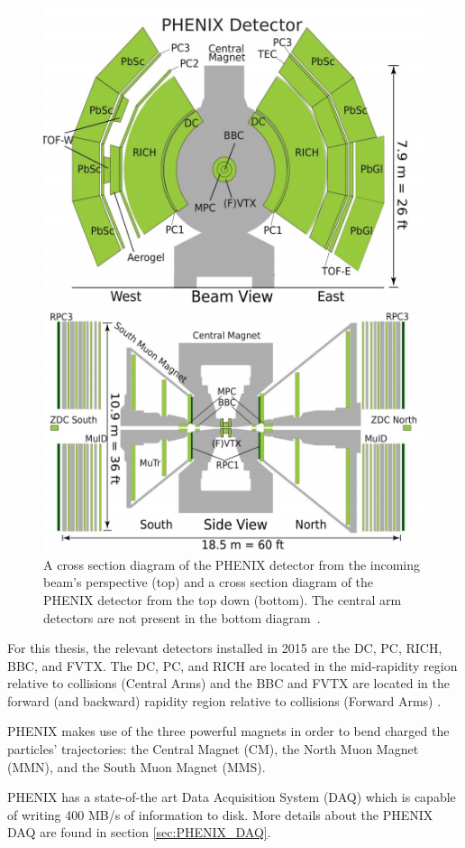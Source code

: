\begin{figure}[!h]
\begin{center}
\includegraphics[width=0.55\linewidth]{figs/phenix_schematic.png}
\caption{A cross section diagram of the PHENIX detector from the incoming beam's perspective (top) and a cross section diagram of the PHENIX detector from the top down (bottom). The central arm detectors are not present in the bottom diagram~\cite{Aidala201444}.}
\label{fig:phenix_schematic}
\end{center}
\end{figure}

For this thesis, the relevant detectors installed in 2015 are the DC, PC, RICH, BBC, and FVTX. The DC, PC, and RICH are located in the mid-rapidity region relative to collisions (Central Arms) and the BBC and FVTX are located in the forward (and backward) rapidity region relative to collisions (Forward Arms) \cite{Adcox2003469}. 

PHENIX makes use of the three powerful magnets in order to bend charged the particles' trajectories: the Central Magnet (CM), the North Muon Magnet (MMN), and the South Muon Magnet (MMS).

PHENIX has a state-of-the art Data Acquisition System (DAQ) which is capable of writing 400 MB/s of information to disk. More details about the PHENIX DAQ are found in section \ref{sec:PHENIX_DAQ}.


